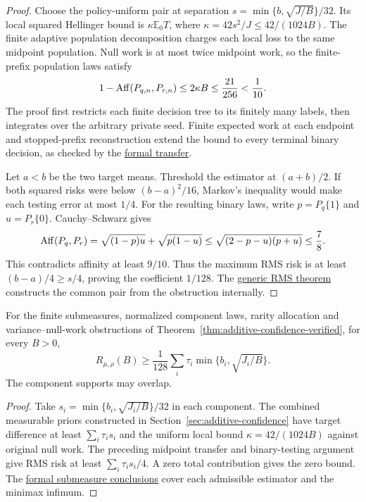 \begin{proof}
Choose the policy-uniform pair at separation
$s=\min\{b,\sqrt{J/B}\}/32$. Its local squared Hellinger bound
is $\kappa\mathbb E_0T$, where
$\kappa=42s^2/J\le42/(1024B)$.
The finite adaptive population decomposition charges each local
loss to the same midpoint population. Null work is at most twice
midpoint work, so the finite-prefix population laws satisfy
\[
 1-\operatorname{Aff}(P_{q,n},P_{r,n})\le2\kappa B
 \le\frac{21}{256}<\frac1{10}.
\]
The proof first restricts each finite decision tree to its finitely
many labels, then integrates over the arbitrary private seed.
Finite expected work at each endpoint and stopped-prefix
reconstruction extend the bound to every terminal binary decision,
as checked by the
\href{https://github.com/davidiach/adaptive-threshold-estimation/blob/8ed87544c861eee47a7b9fd2ede9483529b60e52/lean/ThresholdHC/RMSLocalization/Terminal.lean}{formal transfer}.

Let $a<b$ be the two target means. Threshold the estimator at
$(a+b)/2$. If both squared risks were below $(b-a)^2/16$,
Markov's inequality would make each testing error at most $1/4$.
For the resulting binary laws, write
$p=P_q\{1\}$ and $u=P_r\{0\}$. Cauchy--Schwarz gives
\[
 \operatorname{Aff}(P_q,P_r)
 =\sqrt{(1-p)u}+\sqrt{p(1-u)}
 \le\sqrt{(2-p-u)(p+u)}\le\frac78.
\]
This contradicts affinity at least $9/10$. Thus the maximum
RMS risk is at least $(b-a)/4\ge s/4$, proving the coefficient
$1/128$. The
\href{https://github.com/davidiach/adaptive-threshold-estimation/blob/8ed87544c861eee47a7b9fd2ede9483529b60e52/lean/ThresholdHC/RMSLocalization/CommonPair.lean}{generic RMS theorem}
constructs the common pair from the obstruction internally.
\end{proof}

\begin{theorem}
\label{thm:rms-additive-verified}
For the finite submeasures, normalized component laws, rarity
allocation and variance--null-work obstructions of
Theorem~\ref{thm:additive-confidence-verified}, for every $B>0$,
\[
 R_{\mu,\rho}(B)\ge\frac1{128}\sum_i\tau_i
       \min\{b_i,\sqrt{J_i/B}\}.
\]
The component supports may overlap.
\end{theorem}

\begin{proof}
Take $s_i=\min\{b_i,\sqrt{J_i/B}\}/32$ in each component.
The combined measurable priors constructed in
Section~\ref{sec:additive-confidence} have target difference at
least $\sum_i\tau_i s_i$ and the uniform local bound
$\kappa=42/(1024B)$ against original null work.
The preceding midpoint transfer and binary-testing argument give
RMS risk at least $\sum_i\tau_i s_i/4$.
A zero total contribution gives the zero bound.
The
\href{https://github.com/davidiach/adaptive-threshold-estimation/blob/8ed87544c861eee47a7b9fd2ede9483529b60e52/lean/ThresholdHC/RMSLocalization/Full.lean}{formal submeasure conclusions}
cover each admissible estimator and the minimax infimum.
\end{proof}
